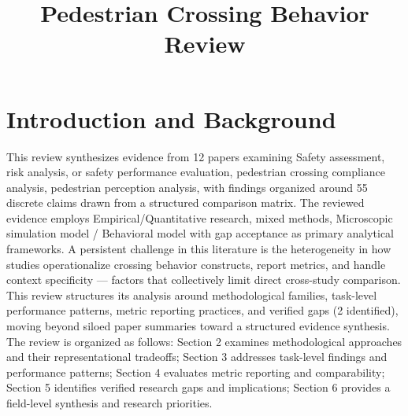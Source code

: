 \documentclass{article}
\title{Pedestrian Crossing Behavior Review}
\begin{document}
\maketitle
\section{Introduction and Background}
This review synthesizes evidence from 12 papers examining Safety assessment, risk analysis, or safety performance evaluation, pedestrian crossing compliance analysis, pedestrian perception analysis, with findings organized around 55 discrete claims drawn from a structured comparison matrix. The reviewed evidence employs Empirical/Quantitative research, mixed methods, Microscopic simulation model / Behavioral model with gap acceptance as primary analytical frameworks. A persistent challenge in this literature is the heterogeneity in how studies operationalize crossing behavior constructs, report metrics, and handle context specificity — factors that collectively limit direct cross-study comparison. This review structures its analysis around methodological families, task-level performance patterns, metric reporting practices, and verified gaps (2 identified), moving beyond siloed paper summaries toward a structured evidence synthesis. The review is organized as follows: Section 2 examines methodological approaches and their representational tradeoffs; Section 3 addresses task-level findings and performance patterns; Section 4 evaluates metric reporting and comparability; Section 5 identifies verified research gaps and implications; Section 6 provides a field-level synthesis and research priorities.
\end{document}
